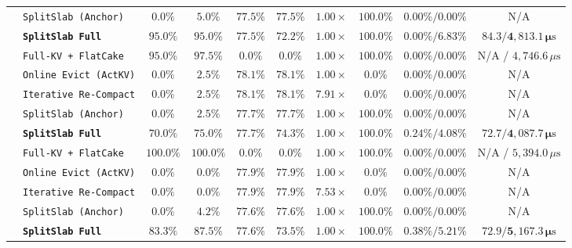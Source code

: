 \documentclass[10pt,journal,compsoc]{IEEEtran}
\theoremstyle{definition}
\theoremstyle{remark}
\begin{document}
\begin{table}[!t]
\begin{tabular}{@{}llcccccccc@{}}
 & \texttt{SplitSlab (Anchor)} & $0.0\%$ & $5.0\%$ & $77.5\%$ & $77.5\%$ & $1.00\times$ & $100.0\%$ & $0.00\% / 0.00\%$ & N/A \\
 & \textbf{\texttt{SplitSlab Full}} & $\mathbf{95.0\%}$ & $\mathbf{95.0\%}$ & $\mathbf{77.5\%}$ & $\mathbf{72.2\%}$ & $\mathbf{1.00\times}$ & $\mathbf{100.0\%}$ & $\mathbf{0.00\% / 6.83\%}$ & $\mathbf{84.3 / 4{,}813.1\,\mu\mathrm{s}}$ \\
\midrule
{}
 & \texttt{Full-KV + FlatCake} & $95.0\%$ & $97.5\%$ & $0.0\%$ & $0.0\%$ & $1.00\times$ & $100.0\%$ & $0.00\% / 0.00\%$ & N/A / $4{,}746.6\,\mu\mathrm{s}$ \\
 & \texttt{Online Evict (ActKV)} & $0.0\%$ & $2.5\%$ & $78.1\%$ & $78.1\%$ & $1.00\times$ & $0.0\%$ & $0.00\% / 0.00\%$ & N/A \\
 & \texttt{Iterative Re-Compact} & $0.0\%$ & $2.5\%$ & $78.1\%$ & $78.1\%$ & $7.91\times$ & $0.0\%$ & $0.00\% / 0.00\%$ & N/A \\
 & \texttt{SplitSlab (Anchor)} & $0.0\%$ & $2.5\%$ & $77.7\%$ & $77.7\%$ & $1.00\times$ & $100.0\%$ & $0.00\% / 0.00\%$ & N/A \\
 & \textbf{\texttt{SplitSlab Full}} & $\mathbf{70.0\%}$ & $\mathbf{75.0\%}$ & $\mathbf{77.7\%}$ & $\mathbf{74.3\%}$ & $\mathbf{1.00\times}$ & $\mathbf{100.0\%}$ & $\mathbf{0.24\% / 4.08\%}$ & $\mathbf{72.7 / 4{,}087.7\,\mu\mathrm{s}}$ \\
\midrule
{}
 & \texttt{Full-KV + FlatCake} & $100.0\%$ & $100.0\%$ & $0.0\%$ & $0.0\%$ & $1.00\times$ & $100.0\%$ & $0.00\% / 0.00\%$ & N/A / $5{,}394.0\,\mu\mathrm{s}$ \\
 & \texttt{Online Evict (ActKV)} & $0.0\%$ & $0.0\%$ & $77.9\%$ & $77.9\%$ & $1.00\times$ & $0.0\%$ & $0.00\% / 0.00\%$ & N/A \\
 & \texttt{Iterative Re-Compact} & $0.0\%$ & $0.0\%$ & $77.9\%$ & $77.9\%$ & $7.53\times$ & $0.0\%$ & $0.00\% / 0.00\%$ & N/A \\
 & \texttt{SplitSlab (Anchor)} & $0.0\%$ & $4.2\%$ & $77.6\%$ & $77.6\%$ & $1.00\times$ & $100.0\%$ & $0.00\% / 0.00\%$ & N/A \\
 & \textbf{\texttt{SplitSlab Full}} & $\mathbf{83.3\%}$ & $\mathbf{87.5\%}$ & $\mathbf{77.6\%}$ & $\mathbf{73.5\%}$ & $\mathbf{1.00\times}$ & $\mathbf{100.0\%}$ & $\mathbf{0.38\% / 5.21\%}$ & $\mathbf{72.9 / 5{,}167.3\,\mu\mathrm{s}}$ \\
\bottomrule
\end{tabular}
\end{table}
\end{document}

